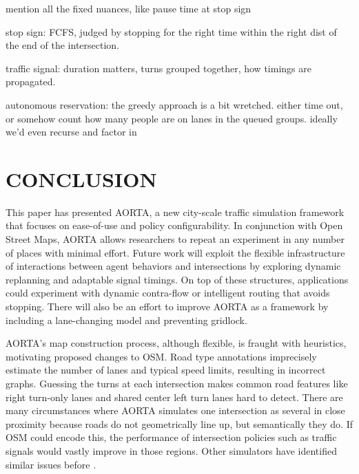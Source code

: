\documentclass[letterpaper, 10 pt, conference]{ieeeconf}  %
\begin{document}
mention all the fixed nuances, like pause time at stop sign

  stop sign: FCFS, judged by stopping for the right time within the right dist of
  the end of the intersection.

  traffic signal: duration matters, turns grouped together, how timings are
  propagated.

  autonomous reservation: the greedy approach is a bit wretched. either time
  out, or somehow count how many people are on lanes in the queued groups.
  ideally we'd even recurse and factor in 



\section{CONCLUSION}
\label{sec:conclusion}

This paper has presented AORTA, a new city-scale traffic simulation framework
that focuses on ease-of-use and policy configurability. In conjunction with Open
Street Maps, AORTA allows researchers to repeat an experiment in any number of
places with minimal effort. Future work will exploit the flexible infrastructure
of interactions between agent behaviors and intersections by exploring dynamic
replanning and adaptable signal timings. On top of these structures,
applications could experiment with dynamic contra-flow \cite{ITSC11-hausknecht}
or intelligent routing that avoids stopping. There will also be an effort to
improve AORTA as a framework by including a lane-changing model and preventing
gridlock. 

AORTA's map construction process, although flexible, is fraught with heuristics,
motivating proposed changes to OSM. Road type annotations imprecisely estimate
the number of lanes and typical speed limits, resulting in incorrect graphs.
Guessing the turns at each intersection makes common road features like right
turn-only lanes and shared center left turn lanes hard to detect. There are many
circumstances where AORTA simulates one intersection as several in close
proximity because roads do not geometrically line up, but semantically they do.
If OSM could encode this, the performance of intersection policies such as
traffic signals would vastly improve in those regions. Other simulators have
identified similar issues before \cite{Krajzewicz_Hertkorn_Ringel_Wagner_2005}.
\end{document}
